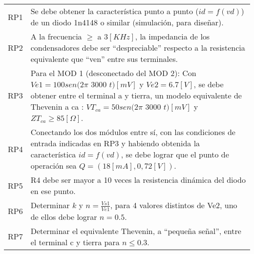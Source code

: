 \begin{table}[h]
\centering
\begin{tabular}{p{} p{}}
RP1 & Se debe obtener la característica punto a punto ($id = f(vd)$) de un diodo 1n4148 o similar (simulación, para diseñar). \\[-0.3cm]
RP2 & A la frecuencia $\geq$ a $3 [KHz]$, la impedancia de los condensadores debe ser “despreciable” respecto a la resistencia equivalente que “ven” entre sus terminales.\\[-0.3cm]
RP3 & Para el MOD 1 (desconectado del MOD 2): Con $Ve1 = 100sen (2\pi$  $3000$  $t)[mV]$ y $ Ve2 = 6.7 [V]$, se debe obtener entre el terminal a y tierra, un modelo equivalente de  Thevenin a ca : $VT_{ca} = 50sen(2\pi$  $3000$  $t)[mV]$ y $ZT_{ca} \geq 85[\Omega]$. \\[-0.3cm]
RP4 & Conectando los dos módulos entre sí, con las condiciones de entrada indicadas en RP3 y habiendo obtenida la característica $id = f(vd)$, se debe lograr que el punto de operación sea $Q = (18[mA], 0,72[V])$. \\[-0.3cm]
RP5 & R4 debe ser mayor a 10 veces la resistencia dinámica del diodo en ese punto.\\[-0.3cm]
RP6 & Determinar $k$ y $n = \frac{Vs1}{Ve1}$, para 4 valores distintos de Ve2, uno de ellos debe lograr $n = 0.5$.\\[-0.3cm]
RP7 & Determinar el equivalente Thevenin, a “pequeña señal”, entre el terminal c y tierra para $n \leq 0.3$.
\end{tabular}
\end{table}